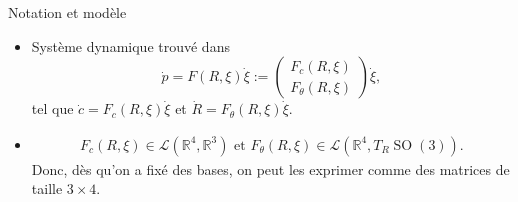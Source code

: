 \documentclass[10pt, envcountsect]{beamer}
\theoremstyle{plain}
\newcommand{\R}{\mathbb{R}}
\DeclareMathOperator{\Skew}{Skew}
\DeclareMathOperator{\SO}{SO}
\begin{document}
%

\begin{frame}{Notation et modèle}
\begin{itemize}
\item Système dynamique trouvé dans \cite{Alouges2013}
\begin{equation}
\label{eq: control system}
	\dot{p} = F(R, \xi) \dot{\xi} := \left ( \begin{array}{c}
	F_c(R, \xi) \\
	F_\theta(R, \xi)
	\end{array}  \right ) \dot{\xi},
\end{equation}
tel que $\dot{c} = F_{c}(R, \xi) \dot{\xi}$ et $\dot{R} =F_{\theta}(R, \xi) \dot{\xi}$.
\item \begin{equation}
\begin{aligned}
	F_c(R, \xi) \in \mathcal{L}(\R^4, \R^3) \text{ et } F_{\theta}(R, \xi) \in \mathcal{L}(\R^4,T_R \SO(3)).
\end{aligned}
\end{equation}
Donc, dès qu'on a fixé des bases, on peut les exprimer comme des matrices de taille $3 \times 4$.

\end{itemize}

\end{frame}
\end{document}
